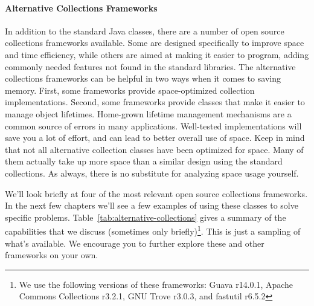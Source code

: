 \paragraph{Alternative Collections Frameworks} In addition to the standard Java
classes, there are a number of open source collections frameworks available. Some are designed
specifically to improve space and time efficiency, while others are aimed at
making it easier to program, adding commonly needed features not
found in the standard libraries. 
The alternative collections frameworks can be helpful in two ways when it comes to saving memory. First,
some frameworks provide space-optimized collection implementations. Second, some frameworks
provide classes that make it easier to manage object lifetimes.
Home-grown lifetime management mechanisms are a common source of errors in many
applications. Well-tested implementations will save you a lot of effort, and
can lead to better overall use of space.
Keep in mind that not all alternative collection classes have
been optimized for space.
Many of them actually take up more space than a similar design using the
standard collections. As always, there is no substitute for analyzing space
usage yourself.

We'll look briefly at four of the most relevant
open source collections frameworks.  In the next few chapters we'll see a
few examples of using these classes to solve specific problems.
Table~\ref{tab:alternative-collections} gives a summary of the capabilities that
we discuss (sometimes only briefly)\footnote{We use the following versions
of these frameworks: Guava r14.0.1,
Apache Commons Collections r3.2.1, GNU Trove r3.0.3, and fastutil r6.5.2}. 
This is just a sampling of what's available. We encourage you to further explore these and
other frameworks on your own.

